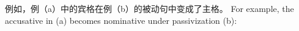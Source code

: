 例如，例（a）中的宾格在例（b）的被动句中变成了主格。
For example, the accusative in (a) becomes nominative under passivization (b):

